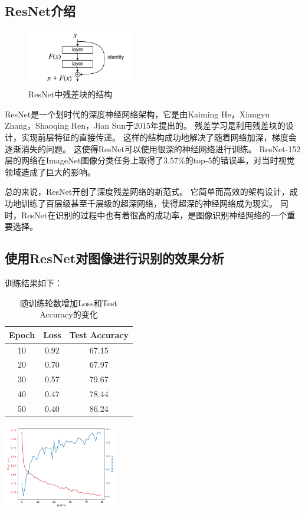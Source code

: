 \subsection{ResNet介绍}

\begin{figure}
    \centering %
    \includegraphics[height=2.5cm]{../../ResNet/ResBlock.png}
    \caption{ResNet中残差块的结构}
\end{figure}

ResNet是一个划时代的深度神经网络架构，它是由Kaiming He，Xiangyu Zhang，Shaoqing Ren，Jian Sun于2015年提出的。\cite{ResNet}
残差学习是利用残差块的设计，实现前层特征的直接传递。
这样的结构成功地解决了随着网络加深，梯度会逐渐消失的问题。
这使得ResNet可以使用很深的神经网络进行训练。
ResNet-152层的网络在ImageNet图像分类任务上取得了3.57\%的top-5的错误率，对当时视觉领域造成了巨大的影响。 \par

总的来说，ResNet开创了深度残差网络的新范式。
它简单而高效的架构设计，成功地训练了百层级甚至千层级的超深网络，使得超深的神经网络成为现实。
同时，ResNet在识别的过程中也有着很高的成功率，是图像识别神经网络的一个重要选择。

\subsection{使用ResNet对图像进行识别的效果分析}
训练结果如下：
\begin{table}[H]
    \begin{minipage}[b]{0.56\linewidth}
    \centering
    \begin{tabular}{c|c|c}
        \hline
        Epoch & Loss & Test Accuracy \\ \hline \hline
        10 & 0.92 & 67.15 \\ \hline
        20 & 0.70 & 67.97 \\ \hline
        30 & 0.57 & 79.67 \\ \hline
        40 & 0.47 & 78.44 \\ \hline
        50 & 0.40 & 86.24 \\ \hline
       \end{tabular}
        \caption{随训练轮数增加Loss和Test Accuracy的变化}
    \end{minipage}
    \begin{minipage}[b]{0.4\linewidth}
    \centering
    \includegraphics[width=50mm]{../../ResNet/ResNet.png}
    \end{minipage}
    \end{table}


